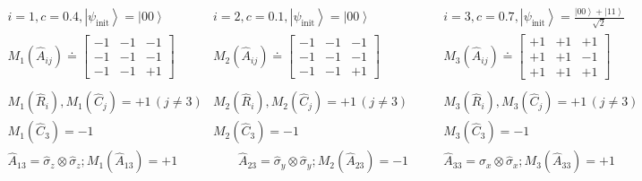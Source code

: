 \documentclass[british,aps,prl,superscriptaddress,nofootinbib,times,reprint]{revtex4-1}
\theoremstyle{plain}
\theoremstyle{plain}
\theoremstyle{definition}
\theoremstyle{remark}
\theoremstyle{remark}
\theoremstyle{remark}
\theoremstyle{plain}
\theoremstyle{plain}
\theoremstyle{plain}
\theoremstyle{definition}
\theoremstyle{definition}
\begin{document}
\begin{table}
 \begin{equation*}
\begin{array}{ccc} 
i=1,c=0.4,\left|\psi_{\text{init}}\right\rangle=\left|00\right\rangle & i=2,c=0.1,\left|\psi_{\text{init}}\right\rangle=\left|00\right\rangle & i=3,c=0.7,\left|\psi_{\text{init}}\right\rangle=\frac{\left|00\right\rangle +\left|11\right\rangle}{\sqrt{2}} \\

M_{1}(\hat{A}_{ij})\doteq\left[\begin{array}{ccc} -1 & -1 & -1\\ -1 & -1 & -1\\ -1 & -1 & +1\end{array}\right] &
M_{2}(\hat{A}_{ij})\doteq\left[\begin{array}{ccc}-1 & -1 & -1\\ -1 & -1 & -1\\ -1 & -1 & +1\end{array}\right] &
M_{3}(\hat{A}_{ij})\doteq\left[\begin{array}{ccc}+1 & +1 & +1\\ +1 & +1 & -1\\ +1 & +1 & +1\end{array}\right]\\ \\


M_{1}(\hat{R}_{i}),M_{1}(\hat{C}_{j})=+1\,(j\neq3) &
M_{2}(\hat{R}_{i}),M_{2}(\hat{C}_{j})=+1\,(j\neq3) &
M_{3}(\hat{R}_{i}),M_{3}(\hat{C}_{j})=+1\,(j\neq3)\\

M_{1}(\hat{C}_{3})=-1 & M_{2}(\hat{C}_{3})=-1 & M_{3}(\hat{C}_{3})=-1\\ 


\hat{A}_{13}=\hat{\sigma}_{z}\otimes\hat{\sigma}_{z};M_{1}(\hat{A}_{13})=+1&
\quad\quad\hat{A}_{23}=\hat{\sigma}_{y}\otimes\hat{\sigma}_{y};M_{2}(\hat{A}_{23})=-1\quad\quad&
\hat{A}_{33}=\hat{\sigma}_{x}\otimes\hat{\sigma}_{x};M_{3}(\hat{A}_{33})=+1\\


\end{array}
\end{equation*}
\end{table}
\end{document}
